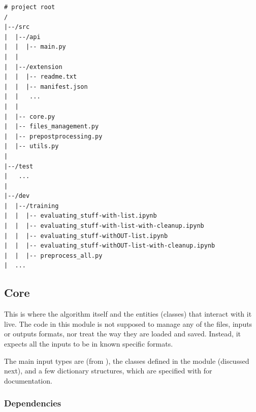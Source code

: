 \documentclass[10pt]{article}
\begin{document}

\begin{lstlisting}[caption=Main code structure.]
# project root
/  
|--/src
|  |--/api
|  |  |-- main.py
|  |  
|  |--/extension
|  |  |-- readme.txt
|  |  |-- manifest.json
|  |   ...
|  |
|  |-- core.py
|  |-- files_management.py
|  |-- prepostprocessing.py 
|  |-- utils.py
|
|--/test 
|   ...
|
|--/dev
|  |--/training
|  |  |-- evaluating_stuff-with-list.ipynb
|  |  |-- evaluating_stuff-with-list-with-cleanup.ipynb
|  |  |-- evaluating_stuff-withOUT-list.ipynb
|  |  |-- evaluating_stuff-withOUT-list-with-cleanup.ipynb
|  |  |-- preprocess_all.py
|  ...
\end{lstlisting}



\subsection{Core}

This is where the algorithm itself and the entities (classes) that interact with it live. The code in this module is not supposed to manage any of the files, inputs or outputs formats, nor treat the way they are loaded and saved. Instead, it expects all the inputs to be in known specific formats.

The main input types are  (from ), the classes defined in the module (discussed next), and a few dictionary structures, which are specified with \footnotemark for documentation\footnotemark.





\subsubsection{Dependencies}

\paragraph{} 
\end{document}
